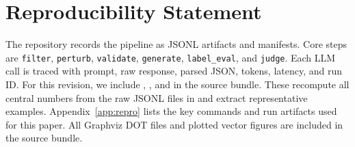 \documentclass[11pt]{article}
\begin{document}
\section*{Reproducibility Statement}

The repository records the pipeline as JSONL artifacts and manifests. Core steps are \texttt{filter}, \texttt{perturb}, \texttt{validate}, \texttt{generate}, \texttt{label\_eval}, and \texttt{judge}. Each LLM call is traced with prompt, raw response, parsed JSON, tokens, latency, and run ID. For this revision, we include , , and  in the source bundle. These recompute all central numbers from the raw JSONL files in  and extract representative examples. Appendix~\ref{app:repro} lists the key commands and run artifacts used for this paper. All Graphviz DOT files and plotted vector figures are included in the source bundle.
\end{document}
